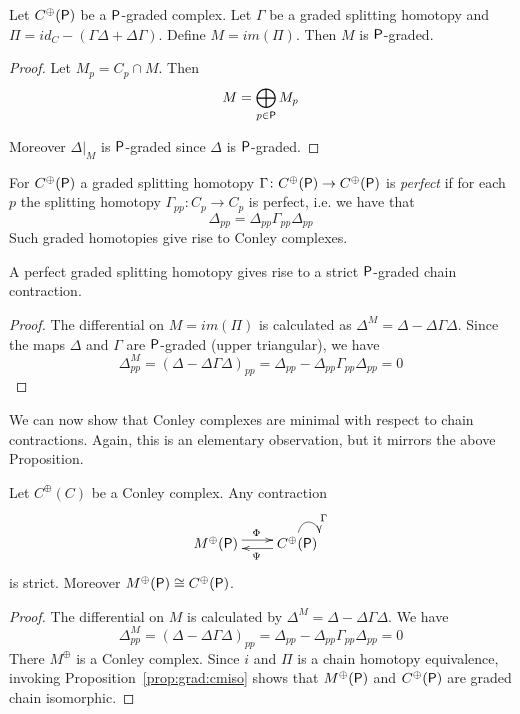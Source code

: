 \begin{prop}\label{prop:grad:contract}
Let $C^\oplus({\mathsf P})$ be a ${\mathsf P}$-graded complex.  Let $\Gamma$ be a graded splitting homotopy and $\Pi = id_C-(\Gamma\Delta+\Delta\Gamma)$.  Define $M = im(\Pi)$.  Then $M$ is ${\mathsf P}$-graded.
\end{prop}
\begin{proof}
Let $M_p = C_p\cap M$.  Then $$M=\bigoplus_{p\in {\mathsf P}} M_p$$

Moreover $\Delta|_M$ is ${\mathsf P}$-graded since $\Delta$ is ${\mathsf P}$-graded.
\end{proof}


For $C^\oplus({\mathsf P})$ a graded splitting homotopy $\Gamma\colon C^\oplus({\mathsf P})\to C^\oplus({\mathsf P})$ is {\em perfect} if for each $p$ the splitting homotopy $\Gamma_{pp}:C_p\to C_p$ is perfect, i.e. we have that $$\Delta_{pp} = \Delta_{pp}\Gamma_{pp}\Delta_{pp}$$  Such graded homotopies give rise to Conley complexes.

\begin{cor}
A perfect graded splitting homotopy gives rise to a strict ${\mathsf P}$-graded chain contraction.
\end{cor}
\begin{proof}
The differential on $M=im(\Pi)$ is calculated as $\Delta^M = \Delta-\Delta\Gamma\Delta$.  Since the maps $\Delta$ and $\Gamma$ are ${\mathsf P}$-graded (upper triangular), we have $$\Delta^M_{pp} = (\Delta-\Delta\Gamma\Delta)_{pp} = \Delta_{pp}-\Delta_{pp}\Gamma_{pp}\Delta_{pp} = 0$$

\end{proof}


We can now show that Conley complexes are minimal with respect to chain contractions.  Again, this is an elementary observation, but it mirrors the above Proposition.

\begin{prop}
Let $C^\oplus(C)$ be a Conley complex.  Any contraction
 \[
\xymatrixrowsep{0.03in}
\xymatrixcolsep{0.3in}
\xymatrix{
M^\oplus(\sP)  \ar[r]<3pt>^{\Phi} & \ar[l]<3pt>^{\Psi} C^\oplus(\sP) \ar@(u,r)^{\Gamma}
}
\]
is strict. Moreover $M^\oplus({\mathsf P})\cong C^\oplus({\mathsf P})$.
\end{prop}
\begin{proof}
The differential on $M$ is calculated by $\Delta^M = \Delta-\Delta\Gamma\Delta$.  We have 
\[
\Delta^M_{pp} = (\Delta-\Delta\Gamma\Delta)_{pp} = \Delta_{pp}-\Delta_{pp}\Gamma_{pp}\Delta_{pp} = 0
\]
There $M^\oplus$ is a Conley complex.  Since $i$ and $\Pi$ is a chain homotopy equivalence, invoking Proposition~\ref{prop:grad:cmiso} shows that $M^\oplus({\mathsf P})$ and $C^\oplus({\mathsf P})$ are graded chain isomorphic. 
\end{proof}



